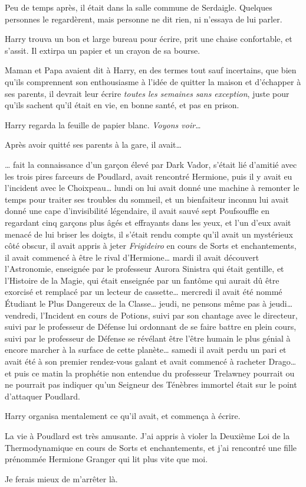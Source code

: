 Peu de temps après, il était dans la salle commune de Serdaigle. Quelques personnes le regardèrent, mais personne ne dit rien, ni n'essaya de lui parler.

Harry trouva un bon et large bureau pour écrire, prit une chaise confortable, et s'assit. Il extirpa un papier et un crayon de sa bourse.

Maman et Papa avaient dit à Harry, en des termes tout sauf incertains, que bien qu'ils comprennent son enthousiasme à l'idée de quitter la maison et d'échapper à ses parents, il devrait leur écrire \emph{toutes les semaines sans exception}, juste pour qu'ils sachent qu'il était en vie, en bonne santé, et pas en prison.

Harry regarda la feuille de papier blanc. \emph{Voyons voir…}

Après avoir quitté ses parents à la gare, il avait…

… fait la connaissance d'un garçon élevé par Dark Vador, s'était lié d'amitié avec les trois pires farceurs de Poudlard, avait rencontré Hermione, puis il y avait eu l'incident avec le Choixpeau… lundi on lui avait donné une machine à remonter le temps pour traiter ses troubles du sommeil, et un bienfaiteur inconnu lui avait donné une cape d'invisibilité légendaire, il avait sauvé sept Poufsouffle en regardant cinq garçons plus âgés et effrayants dans les yeux, et l'un d'eux avait menacé de lui briser les doigts, il s'était rendu compte qu'il avait un mystérieux côté obscur, il avait appris à jeter \emph{Frigideiro} en cours de Sorts et enchantements, il avait commencé à être le rival d'Hermione… mardi il avait découvert l'Astronomie, enseignée par le professeur Aurora Sinistra qui était gentille, et l'Histoire de la Magie, qui était enseignée par un fantôme qui aurait dû être exorcisé et remplacé par un lecteur de cassette… mercredi il avait été nommé Étudiant le Plus Dangereux de la Classe… jeudi, ne pensons même pas à jeudi… vendredi, l'Incident en cours de Potions, suivi par son chantage avec le directeur, suivi par le professeur de Défense lui ordonnant de se faire battre en plein cours, suivi par le professeur de Défense se révélant être l'être humain le plus génial à encore marcher à la surface de cette planète… samedi il avait perdu un pari et avait été à son premier rendez-vous galant et avait commencé à racheter Drago… et puis ce matin la prophétie non entendue du professeur Trelawney pourrait ou ne pourrait pas indiquer qu'un Seigneur des Ténèbres immortel était sur le point d'attaquer Poudlard.

\filbreak
Harry organisa mentalement ce qu'il avait, et commença à écrire.
\begin{writtenNote}

La vie à Poudlard est très amusante. J'ai appris à violer la Deuxième Loi de la Thermodynamique en cours de Sorts et enchantements, et j'ai rencontré une fille prénommée Hermione Granger qui lit plus vite que moi.

Je ferais mieux de m'arrêter là.

\end{writtenNote}

